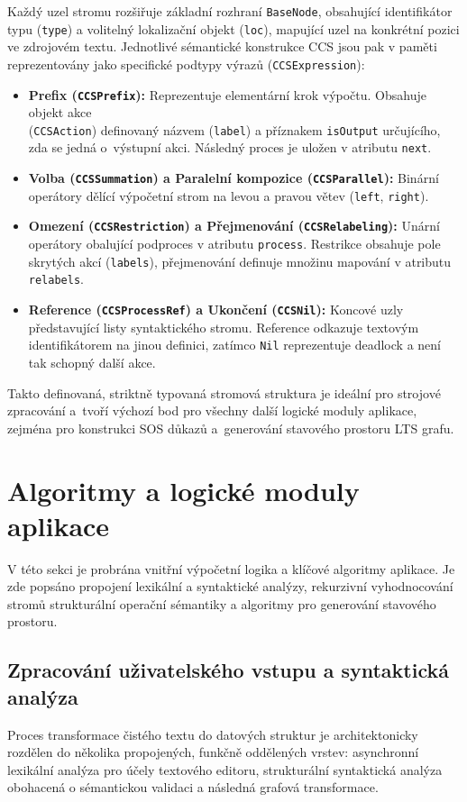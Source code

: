 Každý uzel stromu rozšiřuje základní rozhraní \texttt{BaseNode}, obsahující identifikátor typu (\texttt{type}) a volitelný lokalizační objekt (\texttt{loc}), mapující uzel na konkrétní pozici ve zdrojovém textu. 
Jednotlivé sémantické konstrukce CCS jsou pak v paměti reprezentovány jako specifické podtypy výrazů (\texttt{CCSExpression}):
\begin{itemize}
    \item \textbf{Prefix (\texttt{CCSPrefix}):} Reprezentuje elementární krok výpočtu.
    Obsahuje objekt akce\\
    (\texttt{CCSAction}) definovaný názvem (\texttt{label}) a příznakem \texttt{isOutput} určujícího, zda se jedná o~výstupní akci. 
    Následný proces je uložen v atributu \texttt{next}.
    \item \textbf{Volba (\texttt{CCSSummation}) a Paralelní kompozice (\texttt{CCSParallel}):} Binární operátory dělící výpočetní strom na levou a pravou větev (\texttt{left}, \texttt{right}).
    \item \textbf{Omezení (\texttt{CCSRestriction}) a Přejmenování (\texttt{CCSRelabeling}):} Unární operátory obalující podproces v atributu \texttt{process}. 
    Restrikce obsahuje pole skrytých akcí (\texttt{labels}), přejmenování definuje množinu mapování v atributu \texttt{relabels}.
    \item \textbf{Reference (\texttt{CCSProcessRef}) a Ukončení (\texttt{CCSNil}):} Koncové uzly představující listy syntaktického stromu. 
    Reference odkazuje textovým identifikátorem na jinou definici, zatímco \texttt{Nil} reprezentuje deadlock a není tak schopný další akce.
\end{itemize}

Takto definovaná, striktně typovaná stromová struktura je ideální pro strojové zpracování a~tvoří výchozí bod pro všechny další logické moduly aplikace, zejména pro konstrukci SOS důkazů a~generování stavového prostoru LTS grafu.


\section{Algoritmy a logické moduly aplikace}
V této sekci je probrána vnitřní výpočetní logika a klíčové algoritmy aplikace. 
Je zde popsáno propojení lexikální a syntaktické analýzy, rekurzivní vyhodnocování stromů strukturální operační sémantiky a algoritmy pro generování stavového prostoru. 

\subsection{Zpracování uživatelského vstupu a syntaktická analýza}
\label{sec:syntakticka_analyza}
Proces transformace čistého textu do datových struktur je architektonicky rozdělen do několika propojených, funkčně oddělených vrstev: 
asynchronní lexikální analýza pro účely textového editoru, strukturální syntaktická analýza obohacená o sémantickou validaci a následná grafová transformace.

